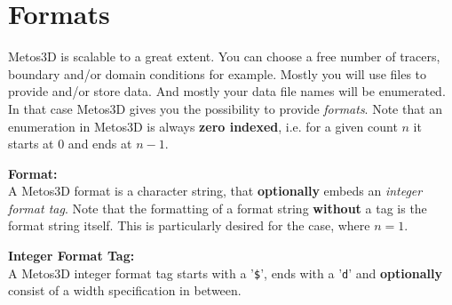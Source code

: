 \documentclass{article}
\begin{document}
%
%
\newpage
\section{Formats}

Metos3D is scalable to a great extent. You can choose a free number of tracers,
boundary and/or domain conditions for example. Mostly you will use files to
provide and/or store data. And mostly your data file names will be
enumerated. In that case Metos3D gives you the possibility to provide \emph{formats}.
Note that
an enumeration in Metos3D is always \textbf{zero indexed},
i.e. for a given count $n$ it starts at $0$ and ends at $n-1$.

\bigskip

\textbf{Format:} \\
A Metos3D format is a character string, that \textbf{optionally} embeds an \emph{integer format tag}.
Note that the formatting of a format string \textbf{without} a tag is the format string
itself. This is particularly desired for the case, where $ n = 1 $.

\bigskip

\textbf{Integer Format Tag:} \\
A Metos3D integer format tag starts with a '\texttt{\$}', ends with a '\texttt{d}'
and \textbf{optionally} consist of a width specification in between.

\bigskip
\end{document}
